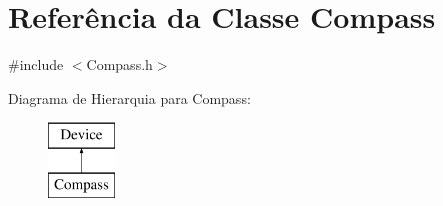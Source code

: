 \hypertarget{classCompass}{\section{Referência da Classe Compass}
\label{classCompass}
}


{\ttfamily \#include $<$Compass.\-h$>$}

Diagrama de Hierarquia para Compass\-:\begin{figure}[H]
\begin{center}
\leavevmode
\includegraphics[height=2.000000cm]{classCompass}
\end{center}
\end{figure}
